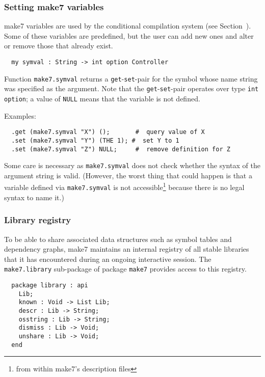 \subsubsection{Setting make7 variables}

make7 variables are used by the conditional compilation system (see
Section~).  Some of these variables are predefined,
but the user can add new ones and alter or remove those that already
exist.

\begin{verbatim}
  my symval : String -> int option Controller
\end{verbatim}

Function {\tt make7.symval} returns a {\tt get}-{\tt set}-pair for the
symbol whose name string was specified as the argument.  Note that the
{\tt get}-{\tt set}-pair operates over type {\tt int option}; a value
of {\tt NULL} means that the variable is not defined.

\noindent Examples:
\begin{verbatim}
  .get (make7.symval "X") ();       #  query value of X 
  .set (make7.symval "Y") (THE 1); #  set Y to 1 
  .set (make7.symval "Z") NULL;     #  remove definition for Z 
\end{verbatim}

Some care is necessary as {\tt make7.symval} does not check whether the
syntax of the argument string is valid.  (However, the worst thing
that could happen is that a variable defined via {\tt make7.symval} is
not accessible\footnote{from within make7's description files} because
there is no legal syntax to name it.)

\subsubsection{Library registry}
\label{sec:libreg}

To be able to share associated data structures such as symbol tables
and dependency graphs, make7 maintains an internal registry of all stable
libraries that it has encountered during an ongoing interactive
session.  The {\tt make7.library} sub-package of package {\tt make7}
provides access to this registry.

\begin{verbatim}
  package library : api
    Lib;
    known : Void -> List Lib;
    descr : Lib -> String;
    osstring : Lib -> String;
    dismiss : Lib -> Void;
    unshare : Lib -> Void;
  end
\end{verbatim}

